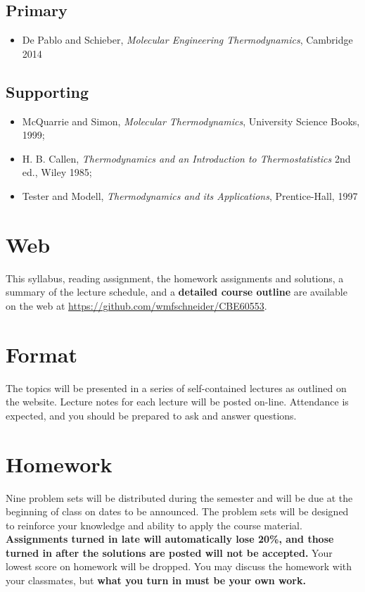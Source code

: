 \documentclass[11pt]{article}
\begin{document}
\subsection{Primary}
\label{sec:orgddfa651}
\begin{itemize}
\item De Pablo and Schieber, \emph{Molecular Engineering Thermodynamics}, Cambridge 2014
\end{itemize}

\subsection{Supporting}
\label{sec:org2f68d7e}
\begin{itemize}
\item McQuarrie and Simon, \emph{Molecular Thermodynamics}, University Science Books, 1999;
\item H. B. Callen, \emph{Thermodynamics and an Introduction to Thermostatistics} 2nd ed., Wiley 1985;
\item Tester and Modell, \emph{Thermodynamics and its Applications}, Prentice-Hall, 1997
\end{itemize}

\section{Web}
\label{sec:org71441f4}
This syllabus, reading assignment, the homework assignments and solutions, a summary of the lecture schedule, and a \textbf{detailed course outline} are available on the web at \url{https://github.com/wmfschneider/CBE60553}.

\section{Format}
\label{sec:orgbc3518e}
The topics will be presented in a series of self-contained lectures as
outlined on the website. Lecture notes for each lecture will be posted
on-line. Attendance is expected, and you should be prepared to ask
and answer questions.

\section{Homework}
\label{sec:orgfc958b5}
Nine problem sets will be distributed during the semester and will be due at the beginning of class on dates to be announced. The problem sets will be designed to reinforce your knowledge and ability to apply the course material.  \textbf{Assignments turned in late will automatically lose 20\%, and those turned in after the solutions are posted will not be accepted.}  Your lowest score on homework will be dropped.  You may discuss the homework with your classmates, but \textbf{what you turn in must be your own work.}
\end{document}

